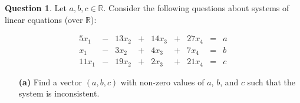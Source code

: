 \documentclass{article}
\newcommand{\R}{\mathbb{R}}
\theoremstyle{definition}
\newtheorem{question}{Question}
\begin{document}
\vspace{.75cm}

\label{Question 3}



\begin{question} Let $a,b,c\in \R$. Consider the following questions about systems of linear equations (over $\R$):


\[\begin{array}{rcrcrcrcl} 5x_1 & - & 13x_2 & + & 14x_3 & + & 27x_4 & = & a \\ x_1 & - & 3x_2 & + & 4x_3 & + & 7x_4 & = & b \\ 11x_1 & - & 19x_2 & + & 2x_3 & + & 21x_4 & = & c \end{array}\]

\vspace{.25cm}

\begin{enumerate}

\item[{\bf (a)}] Find a vector $(a,b,c)$ with non-zero values of $a$, $b$, and $c$ such that the system is inconsistent.


\end{enumerate}
\end{question}
\end{document}
